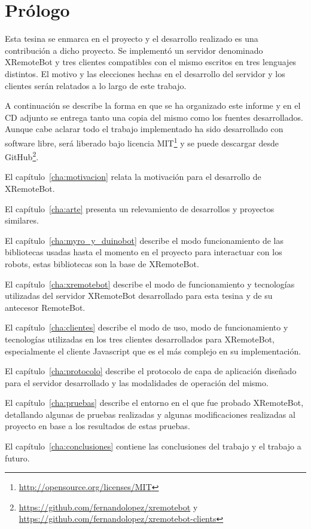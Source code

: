 \chapter*{Prólogo}\label{cha:prologo}


Esta tesina se enmarca en el proyecto \proyecto{} y el desarrollo realizado
es una contribución a dicho proyecto.
Se implementó un servidor denominado XRemoteBot y tres
clientes compatibles
con el mismo escritos en tres lenguajes distintos. El motivo y las elecciones hechas
en el desarrollo del servidor y los clientes serán relatados a lo largo de este
trabajo.

A continuación se describe la forma en que se ha organizado este informe y en el CD
adjunto se entrega tanto una copia del mismo como los fuentes desarrollados.
Aunque
cabe aclarar todo el trabajo implementado ha sido desarrollado con software libre,
será liberado bajo licencia
MIT\footnote{\url{http://opensource.org/licenses/MIT}} y se puede descargar
desde GitHub\footnote{%
\url{https://github.com/fernandolopez/xremotebot} y
\url{https://github.com/fernandolopez/xremotebot-clients}}.

El capítulo~\ref{cha:motivacion} relata la motivación para el desarrollo de
XRemoteBot.

El capítulo~\ref{cha:arte} presenta un relevamiento de desarrollos y
proyectos similares.

El capítulo~\ref{cha:myro_y_duinobot} describe el modo funcionamiento de las
bibliotecas usadas hasta el momento en el proyecto \proyecto{} para
interactuar con los robots, estas
bibliotecas son la base de XRemoteBot.

El capítulo~\ref{cha:xremotebot} describe el modo de funcionamiento y
tecnologías utilizadas del servidor
XRemoteBot desarrollado para esta tesina y de su antecesor RemoteBot.

El capítulo~\ref{cha:clientes} describe el modo de uso, modo de
funcionamiento y
tecnologías utilizadas en los tres clientes desarrollados para
XRemoteBot, especialmente el cliente Javascript que es el más complejo
en su implementación.

El capítulo~\ref{cha:protocolo} describe el protocolo de capa de aplicación diseñado para
el servidor desarrollado y las modalidades de operación del mismo.

El capítulo~\ref{cha:pruebas} describe el entorno en el que fue probado
XRemoteBot, detallando algunas de pruebas realizadas y algunas
modificaciones
realizadas al proyecto en base a los resultados de estas pruebas.

El capítulo~\ref{cha:conclusiones} contiene las conclusiones del trabajo
y el trabajo a futuro.
